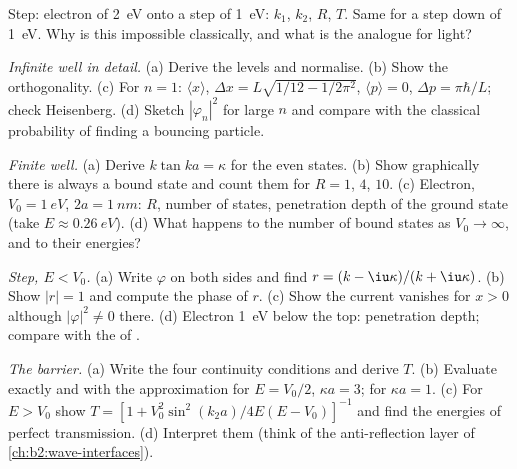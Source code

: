 \begin{exercise}[$\star$]\label{exo:b2:potential-wells-tunneling:4}
Step: electron of \qty{2}{eV} onto a step of \qty{1}{eV}: $k_1$, $k_2$,
$R$, $T$. Same for a step down of \qty{1}{eV}. Why is this impossible
classically, and what is the analogue for light?
\end{exercise}

\begin{exercise}[$\star\star$]\label{exo:b2:potential-wells-tunneling:5}
\emph{Infinite well in detail.} (a) Derive the levels and normalise.
(b) Show the orthogonality. (c) For $n = 1$: $\langle x\rangle$, $\Delta x =
L\sqrt{1/12 - 1/2\pi^2}$, $\langle p\rangle = 0$, $\Delta p = \pi\hbar/L$; check
Heisenberg. (d) Sketch $|\varphi_n|^2$ for large $n$ and compare with the
classical probability of finding a bouncing particle.
\end{exercise}

\begin{exercise}[$\star\star$]\label{exo:b2:potential-wells-tunneling:6}
\emph{Finite well.} (a) Derive $k\tan ka = \kappa$ for the even states.
(b) Show graphically there is always a bound state and count them for
$R = 1$, $4$, $10$. (c) Electron, $V_0 = \qty{1}{eV}$, $2a = \qty{1}{nm}$:
$R$, number of states, penetration depth of the ground state (take
$E \approx \qty{0.26}{eV}$). (d) What happens to the number of bound states
as $V_0 \to \infty$, and to their energies?
\end{exercise}

\begin{exercise}[$\star\star$]\label{exo:b2:potential-wells-tunneling:7}
\emph{Step, $E < V_0$.} (a) Write $\varphi$ on both sides and find $r =
(k - \iu\kappa)/(k + \iu\kappa)$. (b) Show $|r| = 1$ and compute the phase
of $r$. (c) Show the current vanishes for $x > 0$ although $|\varphi|^2 \ne
0$ there. (d) Electron \qty{1}{eV} below the top: penetration depth;
compare with the  of .
\end{exercise}

\begin{exercise}[$\star\star$]\label{exo:b2:potential-wells-tunneling:8}
\emph{The barrier.} (a) Write the four continuity conditions and
derive $T$. (b) Evaluate exactly and with the approximation for $E =
V_0/2$, $\kappa a = 3$; for $\kappa a = 1$. (c) For $E > V_0$ show $T = [1 +
V_0^2\sin^2(k_2a)/4E(E - V_0)]^{-1}$ and find the energies of perfect
transmission. (d) Interpret them (think of the anti-reflection layer of
\cref{ch:b2:wave-interfaces}).
\end{exercise}

